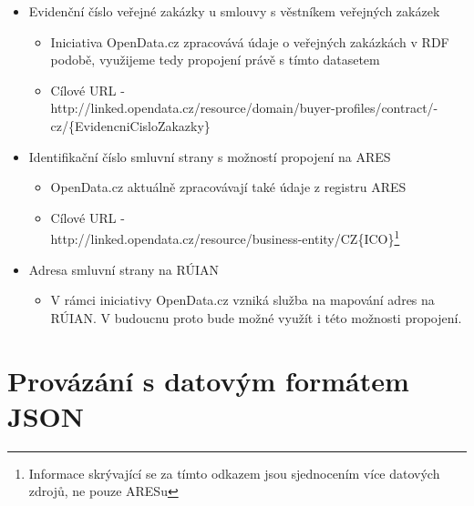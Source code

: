\begin{itemize}
\item Evidenční číslo veřejné zakázky u smlouvy s věstníkem veřejných zakázek
	\begin{itemize}
	\item Iniciativa OpenData.cz\cite{od} zpracovává údaje o veřejných zakázkách v RDF podobě, využijeme tedy propojení právě s tímto datasetem 
	\item Cílové URL -\\http://linked.opendata.cz/resource/domain/buyer-profiles/contract/-\\cz/\{EvidencniCisloZakazky\}
	\end{itemize}
\item Identifikační číslo smluvní strany s možností propojení na ARES
	\begin{itemize}
	\item OpenData.cz aktuálně zpracovávají také údaje z registru ARES
	\item Cílové URL - \\http://linked.opendata.cz/resource/business-entity/CZ\{ICO\}\footnote{Informace skrývající se za tímto odkazem jsou sjednocením více datových zdrojů, ne pouze ARESu} 
	\end{itemize}
\item Adresa smluvní strany na RÚIAN
	\begin{itemize}
	\item V rámci iniciativy OpenData.cz vzniká služba na mapování adres na RÚIAN. V budoucnu proto bude možné využít i této možnosti propojení.
	\end{itemize}
\end{itemize}

\section{Provázání s datovým formátem JSON}

